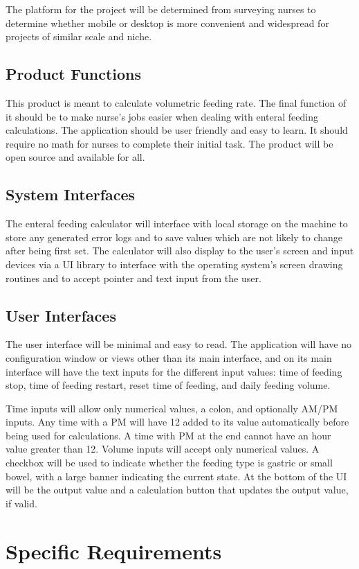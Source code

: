 \documentclass[fullpage,10pt, onecolumn, draftclsnofoot]{IEEEtran}
\begin{document}
The platform for the project will be determined from surveying nurses to determine whether mobile or desktop
is more convenient and widespread for projects of similar scale and niche.

\subsection{Product Functions}
This product is meant to calculate volumetric feeding rate. The final function of it should be to make nurse's jobs easier when dealing with enteral feeding calculations. The application should be user friendly and easy to learn. It should require no math for nurses to complete their initial task. The product will be open source and available for all.

\subsection{System Interfaces}
The enteral feeding calculator will interface with local storage on the machine to store any generated 
error logs and to save values which are not likely to change after being first set. The calculator will
also display to the user's screen and input devices via a UI library to interface with the operating system's screen drawing
routines and to accept pointer and text input from the user.

\subsection{User Interfaces}
The user interface will be minimal and easy to read. The application will have no configuration window
or views other than its main interface, and on its main interface will have the text inputs for the different
input values: time of feeding stop, time of feeding restart, reset time of feeding, and daily feeding volume.

Time inputs will allow only numerical values, a colon, and optionally AM/PM inputs. Any time with a PM will
have 12 added to its value automatically before being used for calculations. A time with PM at the end cannot have an hour value greater than 12.
Volume inputs will accept only numerical values. A checkbox will be used to indicate whether the feeding type is gastric or
small bowel, with a large banner indicating the current state. At the bottom of the UI will be the output value and a calculation
button that updates the output value, if valid.

\section{Specific Requirements}
\end{document}
